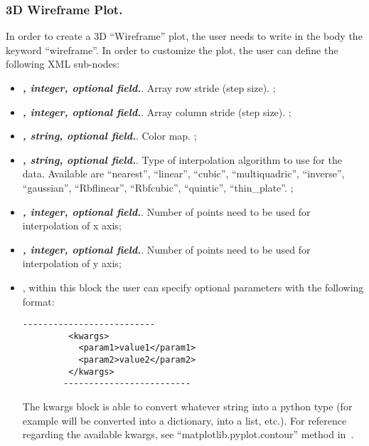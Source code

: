 \subsubsection{3D Wireframe Plot.}
In order to create a 3D ``Wireframe'' plot, the user needs to write in the
 body the keyword ``wireframe''.
%
In order to customize the plot, the user can define the following XML sub-nodes:
  \begin{itemize}
  \item {}\textbf{\textit{, integer, optional field.}}.
  Array row stride (step size).
  ;
  \item {}\textbf{\textit{, integer, optional field.}}.
  Array column stride (step size).
  ;
  \item {}\textbf{\textit{, string, optional field.}}.
  Color map.
  ;
  \item {}\textbf{\textit{, string, optional field.}}.
  Type of interpolation algorithm to use for the data.
  Available are ``nearest'', ``linear'', ``cubic'', ``multiquadric'',
  ``inverse'', ``gaussian'', ``Rbflinear'', ``Rbfcubic'', ``quintic'',
  ``thin\_plate''.
  ;
  \item {}\textbf{\textit{, integer, optional field.}}.
  Number of points need to be used for interpolation of x axis;
  \item {}\textbf{\textit{, integer, optional field.}}.
  Number of points need to be used for interpolation of y axis;
  \item \textit{}, within this block the user can specify optional
  parameters with the following format:
        \begin{lstlisting}[style=XML]
        --------------------------
         <kwargs>
           <param1>value1</param1>
           <param2>value2</param2>
         </kwargs>
        -------------------------
       \end{lstlisting}
  The kwargs block is able to convert whatever string into a python type (for
  example  will be converted into a
  dictionary,  into a list, etc.).
  For reference regarding the available kwargs, see
  ``matplotlib.pyplot.contour'' method in~\cite{MatPlotLib}.
    \end{itemize}

